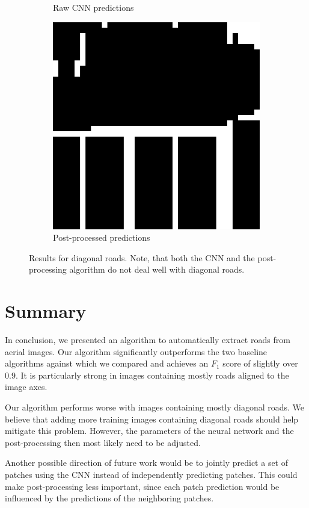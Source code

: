 \documentclass[10pt,conference,compsocconf]{IEEEtran}
\begin{document}
\begin{figure}
\begin{subfigure}[t]{.15\textwidth}
		\caption{Raw CNN predictions}
	\end{subfigure}
	\begin{subfigure}[t]{.15\textwidth}
		\includegraphics[width=1\textwidth]{figs/post_processing/postpro}
		\caption{Post-processed predictions}
	\end{subfigure}
	\caption{Results for diagonal roads. Note, that both the CNN and the post-processing algorithm do not deal well with diagonal roads.}
	\label{fig:post_processing}
\end{figure}

\section{Summary}
\label{sec:summary}
In conclusion, we presented an algorithm to automatically extract roads from aerial images. Our algorithm significantly outperforms the two baseline algorithms against which we compared and achieves an $ F_1 $ score of slightly over 0.9. It is particularly strong in images containing mostly roads aligned to the image axes.

\par 
Our algorithm performs worse with images containing mostly diagonal roads. We believe that adding more training images containing diagonal roads should help mitigate this problem. However, the parameters of the neural network and the post-processing then most likely need to be adjusted. 

\par 
Another possible direction of future work would be to jointly predict a set of patches using the CNN instead of independently predicting patches. This could make post-processing less important, since each patch prediction would be influenced by the predictions of the neighboring patches. 



\end{document}
